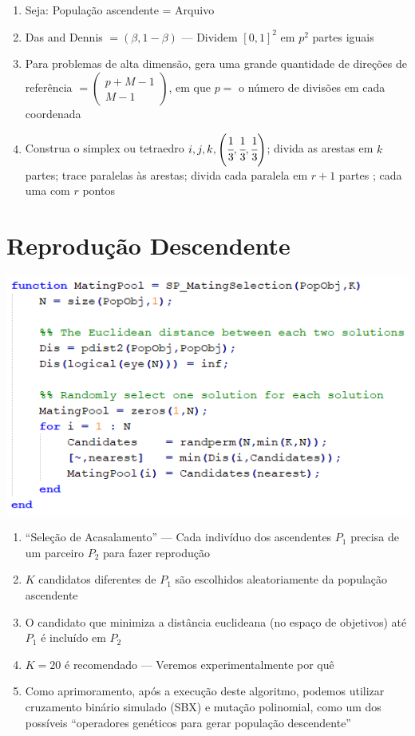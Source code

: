 \documentclass{rbfin}
\begin{document}
\begin{enumerate}[label=(\arabic*), itemsep=0mm]
  \item Seja: População ascendente = Arquivo
  \item Das and Dennis $=(\beta, 1 - \beta)$ --- Dividem $[0,1]^2$ em $p^2$ partes iguais
  \item Para problemas de alta dimensão, gera uma grande quantidade de direções de referência $= \begin{pmatrix} p + M - 1 \\ M - 1 \end{pmatrix}$, em que $p=$ o número de divisões em cada coordenada
  \item Construa o simplex ou tetraedro $i,j,k,\left(\cfrac{1}{3},\cfrac{1}{3},\cfrac{1}{3}\right)$; divida as arestas em $k$ partes; trace paralelas às arestas; divida cada paralela em $r + 1$ partes ; cada uma com $r$ pontos
\end{enumerate}

\doublespacing
\newpage
\section{Reprodução Descendente}

\vspace{6mm}

\begin{center}
\includegraphics[scale=1.2]{MatingSelection}
\end{center}

\begin{enumerate}[label=(\arabic*), itemsep=0mm]
  \item ``Seleção de Acasalamento'' --- Cada indivíduo dos ascendentes $P_1$ precisa de um parceiro $P_2$ para fazer reprodução
  \item $K$ candidatos diferentes de $P_1$ são escolhidos aleatoriamente da população ascendente
  \item O candidato que minimiza a distância euclideana (no espaço de objetivos) até $P_1$ é incluído em $P_2$
  \item $K = 20$ é recomendado --- Veremos experimentalmente por quê
  \item Como aprimoramento, após a execução deste algoritmo, podemos utilizar cruzamento binário simulado (SBX) e mutação polinomial, como um dos possíveis ``operadores genéticos para gerar população descendente''
\end{enumerate}
\end{document}
